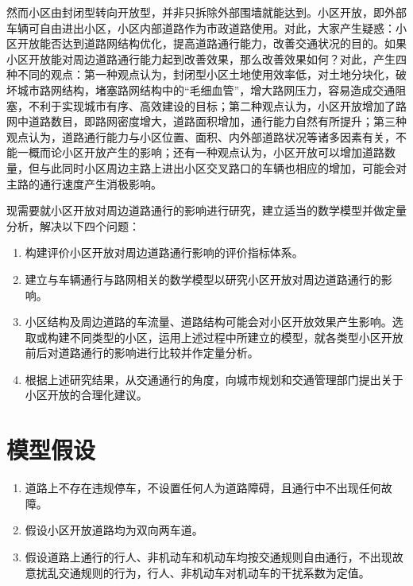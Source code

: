 \documentclass[fontset=windows,a4paper,12pt]{ctexart}
\begin{document}
	然而小区由封闭型转向开放型，并非只拆除外部围墙就能达到。小区开放，即外部车辆可自由进出小区，小区内部道路作为市政道路使用。对此，大家产生疑惑：小区开放能否达到道路网结构优化，提高道路通行能力，改善交通状况的目的。如果小区开放能对周边道路通行能力起到改善效果，那么改善效果如何？对此，产生四种不同的观点：第一种观点认为，封闭型小区土地使用效率低，对土地分块化，破坏城市路网结构，堵塞路网结构中的“毛细血管”，增大路网压力，容易造成交通阻塞，不利于实现城市有序、高效建设的目标；第二种观点认为，小区开放增加了路网中道路数目，即路网密度增大，道路面积增加，通行能力自然有所提升；第三种观点认为，道路通行能力与小区位置、面积、内外部道路状况等诸多因素有关，不能一概而论小区开放产生的影响；还有一种观点认为，小区开放可以增加道路数量，但与此同时小区周边主路上进出小区交叉路口的车辆也相应的增加，可能会对主路的通行速度产生消极影响。

	现需要就小区开放对周边道路通行的影响进行研究，建立适当的数学模型并做定量分析，解决以下四个问题：
\begin{enumerate}
	\item 构建评价小区开放对周边道路通行影响的评价指标体系。
	\item 建立与车辆通行与路网相关的数学模型以研究小区开放对周边道路通行的影响。
	\item 小区结构及周边道路的车流量、道路结构可能会对小区开放效果产生影响。选取或构建不同类型的小区，运用上述过程中所建立的模型，就各类型小区开放前后对道路通行的影响进行比较并作定量分析。
	\item 根据上述研究结果，从交通通行的角度，向城市规划和交通管理部门提出关于小区开放的合理化建议。
\end{enumerate}
  \section{模型假设}
  \begin{enumerate}
  	\item 道路上不存在违规停车，不设置任何人为道路障碍，且通行中不出现任何故障。
  	\item 假设小区开放道路均为双向两车道。
  	\item 假设道路上通行的行人、非机动车和机动车均按交通规则自由通行，不出现故意扰乱交通规则的行为，行人、非机动车对机动车的干扰系数为定值。
  \end{enumerate}
\end{document}
